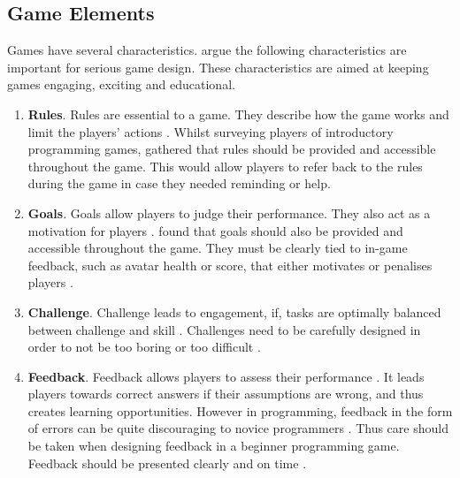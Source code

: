 \documentclass[a4paper,11.5pt]{report}
\numberwithin{figure}{section}
\numberwithin{table}{section}
\numberwithin{equation}{section}
\numberwithin{equation}{section}
\begin{document}
\subsection{Game Elements} %

Games have several characteristics. \citet{roungas2015} argue the following characteristics are important for serious game design. These characteristics are aimed at keeping games engaging, exciting and educational.

\begin{enumerate}
	\item \textbf{Rules}. Rules are essential to a game. They describe how the game works and limit the players' actions \citep{roungas2015}. Whilst surveying players of introductory programming games, \citet{Barnes2007} gathered that rules should be provided and accessible throughout the game. This would allow players to refer back to the rules during the game in case they needed reminding or help.

	\item \textbf{Goals}. Goals allow players to judge their performance. They also act as a motivation for players \citep{roungas2015}. \citep{Barnes2007} found that goals should also be provided and accessible throughout the game. They must be clearly tied to in-game feedback, such as avatar health or score, that either motivates or penalises players \citep{Barnes2007}.
	
	\item \textbf{Challenge}. Challenge leads to engagement, if, tasks are optimally balanced between challenge and skill \citep{whitton2011, flow}. Challenges need to be carefully designed in order to not be too boring or too difficult \citep{roungas2015}.
	
	\item \textbf{Feedback}. Feedback allows players to assess their performance \citep{roungas2015}. It leads players towards correct answers if their assumptions are wrong, and thus creates learning opportunities. However in programming, feedback in the form of errors can be quite discouraging to novice programmers \citep{lee2011}. Thus care should be taken when designing feedback in a beginner programming game. Feedback should be presented clearly and on time \citep{roungas2015}.
\end{enumerate}


\end{document}
